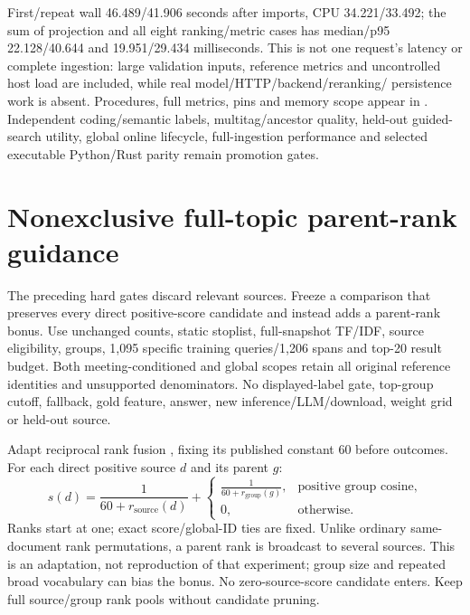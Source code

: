 \documentclass[11pt]{article}
\begin{document}
First/repeat wall 46.489/41.906 seconds after imports, CPU 34.221/33.492;
the sum of projection and all eight ranking/metric cases has median/p95
22.128/40.644 and 19.951/29.434 milliseconds. This is not one request's latency
or complete ingestion: large validation inputs, reference metrics and
uncontrolled host load are included, while real model/HTTP/backend/reranking/
persistence work is absent. Procedures, full metrics, pins and memory scope
appear in . Independent
coding/semantic labels, multitag/ancestor quality, held-out guided-search
utility, global online lifecycle, full-ingestion performance and selected
executable Python/Rust parity remain promotion gates.

\section{Nonexclusive full-topic parent-rank guidance}
The preceding hard gates discard relevant sources. Freeze a comparison that
preserves every direct positive-score candidate and instead adds a parent-rank
bonus. Use unchanged counts, static stoplist, full-snapshot TF/IDF, source
eligibility, groups, 1,095 specific training queries/1,206 spans and top-20
result budget. Both meeting-conditioned and global scopes retain all original
reference identities and unsupported denominators. No displayed-label gate,
top-group cutoff, fallback, gold feature, answer, new inference/LLM/download,
weight grid or held-out source.

Adapt reciprocal rank fusion \cite{rrf2009}, fixing its published constant
60 before outcomes. For each direct positive source $d$ and its parent $g$:
\[
s(d)=\frac{1}{60+r_{\mathrm{source}}(d)}+
\begin{cases}\frac{1}{60+r_{\mathrm{group}}(g)},&\text{positive group cosine},\\
0,&\text{otherwise}.\end{cases}
\]
Ranks start at one; exact score/global-ID ties are fixed. Unlike ordinary
same-document rank permutations, a parent rank is broadcast to several
sources. This is an adaptation, not reproduction of that experiment; group
size and repeated broad vocabulary can bias the bonus. No zero-source-score
candidate enters. Keep full source/group rank pools without candidate pruning.
\end{document}
